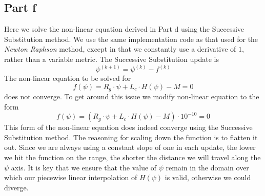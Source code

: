\documentclass[11pt]{article}
\begin{document}
\subsection*{Part f}
Here we solve the non-linear equation derived in Part d using the Successive Substitution method. We use the same implementation code as that used for the \textit{Newton Raphson} method, except in that we constantly use a derivative of $1$, rather than a variable metric. The Successive Substitution update is
$$\boxed{\psi^{(k+1)} = \psi^{(k)} - f^{(k)}}$$
The non-linear equation to be solved for
$$f(\psi) = R_g \cdot \psi + L_c \cdot H(\psi) - M = 0$$
does not converge. To get around this issue we modify non-linear equation to the form
$$\boxed{f(\psi) = (R_g \cdot \psi + L_c \cdot H(\psi) - M ) \cdot 10^{-10} = 0}$$
This form of the non-linear equation does indeed converge using the Successive Substitution method. The reasoning for scaling down the function is to flatten it out. Since we are always using a constant slope of one in each update, the lower we hit the function on the range, the shorter the distance we will travel along the $\psi$ axis. It is key that we ensure that the value of $\psi$ remain in the domain over which our piecewise linear interpolation of $H(\psi)$ is valid, otherwise we could diverge. 
\end{document}
